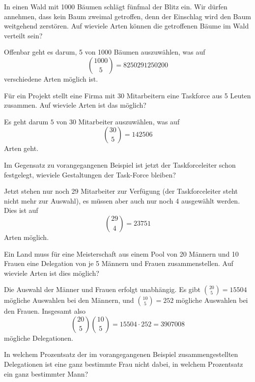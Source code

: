 \begin{beispiele}
\item In einen Wald mit 1000 Bäumen schlägt fünfmal der Blitz ein.
Wir dürfen annehmen, dass kein Baum zweimal getroffen, denn der
Einschlag wird den Baum weitgehend zerstören.
Auf wieviele Arten
können die getroffenen Bäume im Wald verteilt sein?

\begin{loesung}
Offenbar geht es darum, 5 von 1000 Bäumen auszuwählen, was 
auf
\[
\binom{1000}{5}=8250291250200
\]
verschiedene Arten möglich ist.
\end{loesung}

\item Für ein Projekt stellt eine Firma mit 30 Mitarbeitern eine Taskforce
aus 5 Leuten zusammen.
Auf wieviele Arten ist das möglich?


\begin{loesung}
Es geht darum $5$ von $30$ Mitarbeiter auszuwählen, was auf
\[
\binom{30}{5}=142506
\]
Arten geht.
\end{loesung}

\item Im Gegensatz zu vorangegangenen Beispiel ist jetzt der
Taskforceleiter schon festgelegt, wieviele Gestaltungen der
Task-Force bleiben?

\begin{loesung}
Jetzt stehen nur noch 29 Mitarbeiter zur Verfügung (der Taskforceleiter
steht nicht mehr zur Auswahl), es müssen aber auch nur noch 4 ausgewählt
werden.
Dies ist auf
\[
\binom{29}{4}=23751
\]
Arten möglich.
\end{loesung}

\item\label{meisterschaft}
Ein Land muss für eine Meisterschaft aus einem Pool von
20 Männern und 10 Frauen eine Delegation von je 5 Männern
und Frauen zusammenstellen.
Auf wieviele Arten ist dies möglich?

\begin{loesung}
Die Auswahl der Männer und Frauen erfolgt unabhängig.
Es gibt
$\binom{20}{5}=15504$ mögliche Auswahlen bei den Männern,
und $\binom{10}{5}=252$ mögliche Auswahlen bei den Frauen.
Insgesamt also
\[
\binom{20}{5}\binom{10}{5}=15504\cdot 252 = 3907008
\]
mögliche Delegationen.
\end{loesung}

\item In welchem Prozentsatz der im vorangegangenen Beispiel
zusammengestellten Delegationen ist eine ganz bestimmte Frau
nicht dabei, in welchem Prozentsatz ein ganz bestimmter Mann?


\end{beispiele}
